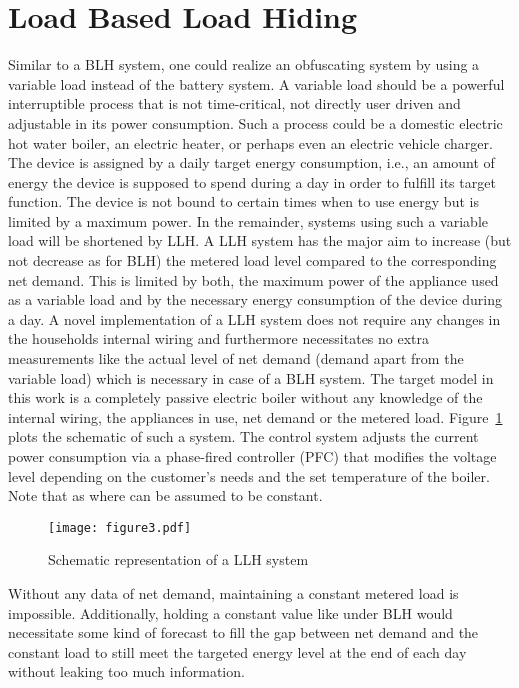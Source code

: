 \documentclass{article}
\begin{document}
\section{Load Based Load Hiding}\label{sec:LLH}
Similar to a \ac{BLH} system, one could realize an obfuscating system by using a variable load instead of the battery system. A variable load should be a powerful interruptible process that is not time-critical, not directly user driven and adjustable in its power consumption. Such a process could be a domestic electric hot water boiler, an electric heater, or perhaps even an electric vehicle charger.
The device is assigned by a daily target energy consumption, i.e., an amount of energy the device is supposed to spend during a day in order to fulfill its target function.
The device is not bound to certain times when to use energy but is limited by a maximum power.
 In the remainder, systems using such a variable load will be shortened by \acf{LLH}.
A \ac{LLH} system has the major aim to increase (but not decrease as for \ac{BLH}) the metered load level compared to the corresponding net demand. This is limited by both, the maximum power of the appliance used as a variable load and by the necessary energy consumption of the device during a day.
A novel implementation of a \ac{LLH} system does not require any changes in the households internal wiring and furthermore necessitates no extra measurements like the actual level of net demand (demand apart from the variable load) which is necessary in case of a BLH system. The target model in this work is a completely passive electric boiler without any knowledge of the internal wiring, the appliances in use, net demand or the metered load. Figure~\ref{llh_system} plots the schematic of such a system. The control system adjusts the current power consumption via a phase-fired controller (PFC) that modifies the voltage level depending on the customer's needs and the set temperature of the boiler. Note that  as  where  can be assumed to be constant.
\begin{figure}[h!]
	\centering
	\texttt{[image: figure3.pdf]}
	\caption{Schematic representation of a \ac{LLH} system}
	\label{llh_system}
\end{figure}
Without any data of net demand, maintaining a constant metered load is impossible. Additionally, holding a constant value like under \ac{BLH} would necessitate some kind of forecast to fill the gap between net demand and the constant load to still meet the targeted energy level at the end of each day without leaking too much information. 
\end{document}
